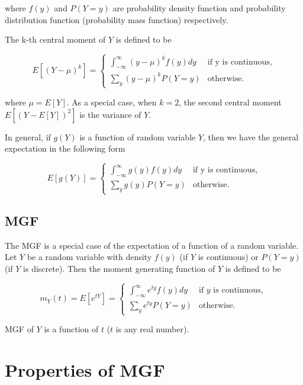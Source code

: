 \documentclass[
]{book}
\begin{document}
where \(f(y)\) and \(P(Y=y)\) are probability density function and probability distribution function (probability mass function) respectively.

The k-th central moment of \(Y\) is defined to be

\[
\displaystyle E[(Y-\mu)^k] = \begin{cases} 
 \int_{-\infty}^{\infty} (y-\mu)^k f(y)dy & \text{if y is continuous}, \\  
 \sum_y (y-\mu)^kP(Y=y) & \text{otherwise}.
 \end{cases}
\]

where \(\mu = E[Y]\). As a special case, when \(k=2\), the second central moment \(E[(Y-E[Y])^2]\) is the variance of \(Y\).

In general, if \(g(Y)\) is a function of random variable \(Y\), then we have the general expectation in the following form

\[
\displaystyle E[g(Y)] = \begin{cases} 
 \int_{-\infty}^{\infty} g(y) f(y)dy & \text{if y is continuous}, \\  
 \sum_y g(y)P(Y=y) & \text{otherwise}.
 \end{cases}
\]

\hypertarget{mgf}{%
\subsection{MGF}\label{mgf}}

The MGF is a special case of the expectation of a function of a random variable. Let \(Y\) be a random variable with density \(f(y)\) (if \(Y\) is continuous) or \(P(Y=y)\) (if \(Y\) is discrete). Then the moment generating function of \(Y\) is defined to be

\[
\displaystyle m_Y(t) = E[e^{tY}] = \begin{cases} 
 \int_{-\infty}^{\infty} e^{ty} f(y)dy & \text{if $y$ is continuous}, \\  
 \sum_y e^{ty}P(Y=y) & \text{otherwise}.
 \end{cases}
\]

MGF of \(Y\) is a function of \(t\) (\(t\) is any real number).

\hfill\break

\hypertarget{properties-of-mgf}{%
\section{Properties of MGF}\label{properties-of-mgf}}
\end{document}
